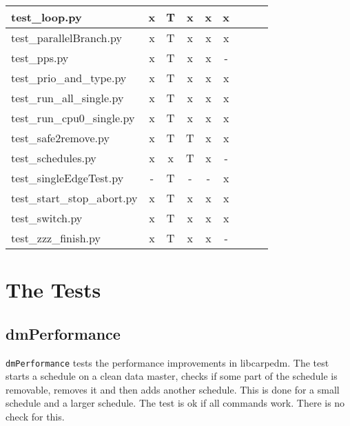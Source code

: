 \documentclass[12pt,a4paper]{report}
\begin{document}
\begin{table}
\begin{tabular}[t]{|l|c|c|c|c|c|c|c|c|}
test\_loop.py                 &   x        &   T             &   x           &   x              &   x                \\ \hline
test\_parallelBranch.py       &   x        &   T             &   x           &   x              &   x                \\ \hline
test\_pps.py                  &   x        &   T             &   x           &   x              &   -                \\ \hline
test\_prio\_and\_type.py      &   x        &   T             &   x           &   x              &   x                \\ \hline
test\_run\_all\_single.py     &   x        &   T             &   x           &   x              &   x                \\ \hline
test\_run\_cpu0\_single.py    &   x        &   T             &   x           &   x              &   x                \\ \hline
test\_safe2remove.py          &   x        &   T             &   T           &   x              &   x                \\ \hline
test\_schedules.py            &   x        &   x             &   T           &   x              &   -                \\ \hline
test\_singleEdgeTest.py       &   -        &   T             &   -           &   -              &   x                \\ \hline
test\_start\_stop\_abort.py   &   x        &   T             &   x           &   x              &   x                \\ \hline
test\_switch.py               &   x        &   T             &   x           &   x              &   x                \\ \hline
test\_zzz\_finish.py          &   x        &   T             &   x           &   x              &   -                \\ \hline
\end{tabular}

\end{table}
\chapter{The Tests}
\section{dmPerformance}
\texttt{dmPerformance} tests the performance improvements in libcarpedm.
The test starts a schedule on a clean data master, checks if some part of the schedule is removable, removes it and
then adds another schedule. This is done for a small schedule and a larger schedule. The test is ok if all commands
work. There is no check for this.
\end{document}
